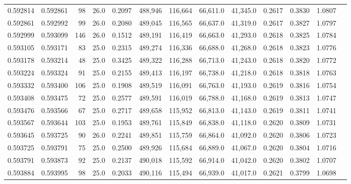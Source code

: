 \begin{tabular}{rrrrrrrrrrrrr}
0.592814 & 0.592861 &    98 & 26.0 &                                     0.2097 & 488,946 & 116,664 &  66,611.0 &  41,345.0 & 0.2617 & 0.3830 & 1.0807 \\
0.592861 & 0.592992 &    99 & 26.0 &                                     0.2080 & 489,045 & 116,565 &  66,637.0 &  41,319.0 & 0.2617 & 0.3827 & 1.0797 \\
0.592999 & 0.593099 &   146 & 26.0 &                                     0.1512 & 489,191 & 116,419 &  66,663.0 &  41,293.0 & 0.2618 & 0.3825 & 1.0784 \\
0.593105 & 0.593171 &    83 & 25.0 &                                     0.2315 & 489,274 & 116,336 &  66,688.0 &  41,268.0 & 0.2618 & 0.3823 & 1.0776 \\
0.593178 & 0.593214 &    48 & 25.0 &                                     0.3425 & 489,322 & 116,288 &  66,713.0 &  41,243.0 & 0.2618 & 0.3820 & 1.0772 \\
0.593224 & 0.593324 &    91 & 25.0 &                                     0.2155 & 489,413 & 116,197 &  66,738.0 &  41,218.0 & 0.2618 & 0.3818 & 1.0763 \\
0.593332 & 0.593400 &   106 & 25.0 &                                     0.1908 & 489,519 & 116,091 &  66,763.0 &  41,193.0 & 0.2619 & 0.3816 & 1.0754 \\
0.593408 & 0.593475 &    72 & 25.0 &                                     0.2577 & 489,591 & 116,019 &  66,788.0 &  41,168.0 & 0.2619 & 0.3813 & 1.0747 \\
0.593476 & 0.593566 &    67 & 25.0 &                                     0.2717 & 489,658 & 115,952 &  66,813.0 &  41,143.0 & 0.2619 & 0.3811 & 1.0741 \\
0.593567 & 0.593644 &   103 & 25.0 &                                     0.1953 & 489,761 & 115,849 &  66,838.0 &  41,118.0 & 0.2620 & 0.3809 & 1.0731 \\
0.593645 & 0.593725 &    90 & 26.0 &                                     0.2241 & 489,851 & 115,759 &  66,864.0 &  41,092.0 & 0.2620 & 0.3806 & 1.0723 \\
0.593725 & 0.593791 &    75 & 25.0 &                                     0.2500 & 489,926 & 115,684 &  66,889.0 &  41,067.0 & 0.2620 & 0.3804 & 1.0716 \\
0.593791 & 0.593873 &    92 & 25.0 &                                     0.2137 & 490,018 & 115,592 &  66,914.0 &  41,042.0 & 0.2620 & 0.3802 & 1.0707 \\
0.593884 & 0.593995 &    98 & 25.0 &                                     0.2033 & 490,116 & 115,494 &  66,939.0 &  41,017.0 & 0.2621 & 0.3799 & 1.0698 \\

\end{tabular}
